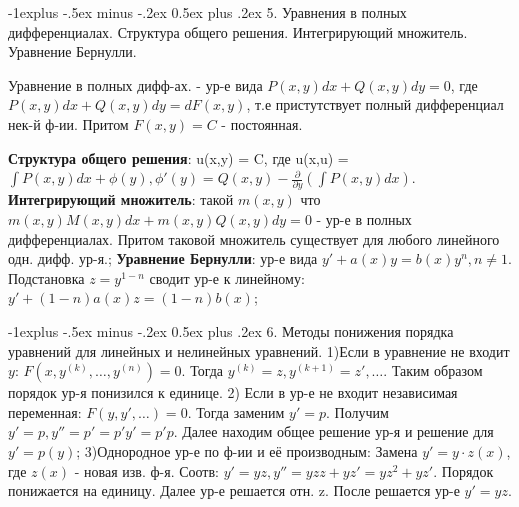 \documentclass[unicode,10pt, landscape]{article}
\makeatletter
\renewcommand{\subsection}{\@startsection{subsection}{2}{0mm}%
                                {-1explus -.5ex minus -.2ex}%
                                {0.5ex plus .2ex}%
                                {\normalfont\normalsize\bfseries}}
\makeatother
\begin{document}
\subsection{5. Уравнения в полных дифференциалах. Структура общего решения. Интегрирующий множитель. Уравнение Бернулли.}
\begin{Def}
Уравнение в полных дифф-ах. - ур-е вида $P(x,y)dx+Q(x,y)dy = 0$, где $P(x,y)dx + Q(x,y)dy = dF(x,y)$, т.е пристутствует полный дифференциал нек-й ф-ии. Притом $F(x,y) = C$ - постоянная.
\end{Def}
{\bf Структура общего решения}: u(x,y) = C, где u(x,u) = $\int P(x,y)dx + \phi(y), \phi'(y) = Q(x,y) - \frac{\partial}{\partial y}(\int P(x, y)dx)$.
{\bf Интегрирующий множитель}: такой $m(x,y)$ что $m(x,y)M(x,y)dx + m(x,y)Q(x,y)dy = 0$ - ур-е в полных дифференциалах. Притом таковой множитель существует для любого линейного одн. дифф. ур-я.;
{\bf Уравнение Бернулли}: ур-е вида $y'+a(x)y = b(x)y^n, n \neq 1$. Подстановка $z = y^{1-n}$ сводит ур-е к линейному: $y' + (1-n)a(x)z = (1-n)b(x)$;


\subsection{6. Методы понижения порядка уравнений для линейных и нелинейных уравнений.}
1)Если в уравнение не входит $y$: $F(x, y^{(k)}, \ldots, y^{(n)}) = 0$. Тогда $y^{(k)} = z, y^{(k+1)} = z', \ldots$. Таким образом порядок ур-я понизился к единице.
2) Если в ур-е не входит независимая переменная: $F(y, y', \ldots) = 0$. Тогда заменим $y' = p$. Получим $y' = p, y'' = p' = p'y' = p'p$. Далее находим общее решение ур-я и решение для $y' = p(y)$;
3)Однородное ур-е по ф-ии и её производным: Замена $y' = y\cdot z(x)$, где $z(x)$ - новая изв. ф-я. Соотв: $y' = yz, y'' = yzz + yz' = yz^2 + yz'$. Порядок понижается на единицу. Далее ур-е решается отн. z. После решается ур-е $y' = yz$.

\end{document}
